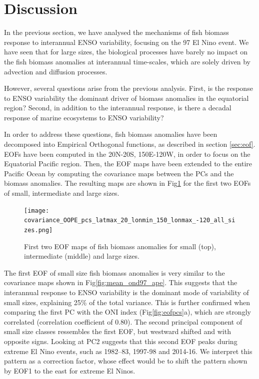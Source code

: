 \section{Discussion}

In the previous section, we have analysed the mechanisms of fish biomass response to interannual ENSO variability, focusing on the 97 El Nino event. We have seen that for large sizes, the biological processes have barely no impact on the fish biomass anomalies at interannual time-scales, which are solely driven by advection and diffusion processes.

However, several questions arise from the previous analysis. First, is the response to ENSO variability the dominant driver of biomass anomalies in the equatorial region? Second, in addition to the interannual response, is there a decadal response of marine ecosystems to ENSO variability?

In order to address these questions, fish biomass anomalies have been decomposed into Empirical Orthogonal functions, as described in section \ref{sec:eof}. EOFs have been computed in the 20N-20S, 150E-120W, in order to focus on the Equatorial Pacific region. Then, the EOF maps have been extended to the entire Pacific Ocean by computing the covariance maps between the PCs and the biomass anomalies. The resulting maps are shown in Fig\ref{fig:eofmaps} for the first two EOFs of small, intermediate and large sizes.

\begin{figure}
    \centering
    \texttt{[image: covariance\_OOPE\_pcs\_latmax\_20\_lonmin\_150\_lonmax\_-120\_all\_sizes.png]}
    \caption{First two EOF maps of fish biomass anomalies for small (top), intermediate (middle) and large sizes.}
    \label{fig:eofmaps}
\end{figure}

The first EOF of small size fish biomass anomalies is very similar to the covariance maps shown in Fig\ref{fig:mean_ond97_ape}. This suggests that the interannual response to ENSO variability is the dominant mode of variability of small sizes, explaining 25\% of the total variance. This is further confirmed when comparing the first PC with the ONI index (Fig\ref{fig:eofpcs}a), which are strongly correlated (correlation coefficient of 0.80). The second principal component of small size classes ressembles the first EOF, but westward shifted and with opposite signs. Looking at PC2 suggests that this second EOF peaks during extreme El Nino events, such as 1982–83, 1997-98 and 2014-16. We interpret this pattern as a correction factor, whose effect would be to shift the pattern shown by EOF1 to the east for extreme El Ninos.

